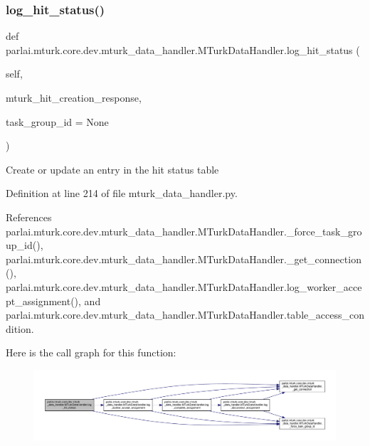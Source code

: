 \subsubsection{\texorpdfstring{log\+\_\+hit\+\_\+status()}{log\_hit\_status()}}
{\footnotesize\ttfamily def parlai.\+mturk.\+core.\+dev.\+mturk\+\_\+data\+\_\+handler.\+M\+Turk\+Data\+Handler.\+log\+\_\+hit\+\_\+status (\begin{DoxyParamCaption}\item[{}]{self,  }\item[{}]{mturk\+\_\+hit\+\_\+creation\+\_\+response,  }\item[{}]{task\+\_\+group\+\_\+id = {\ttfamily None} }\end{DoxyParamCaption})}

\begin{DoxyVerb}Create or update an entry in the hit status table\end{DoxyVerb}
 

Definition at line 214 of file mturk\+\_\+data\+\_\+handler.\+py.



References parlai.\+mturk.\+core.\+dev.\+mturk\+\_\+data\+\_\+handler.\+M\+Turk\+Data\+Handler.\+\_\+force\+\_\+task\+\_\+group\+\_\+id(), parlai.\+mturk.\+core.\+dev.\+mturk\+\_\+data\+\_\+handler.\+M\+Turk\+Data\+Handler.\+\_\+get\+\_\+connection(), parlai.\+mturk.\+core.\+dev.\+mturk\+\_\+data\+\_\+handler.\+M\+Turk\+Data\+Handler.\+log\+\_\+worker\+\_\+accept\+\_\+assignment(), and parlai.\+mturk.\+core.\+dev.\+mturk\+\_\+data\+\_\+handler.\+M\+Turk\+Data\+Handler.\+table\+\_\+access\+\_\+condition.

Here is the call graph for this function\+:
\nopagebreak
\begin{figure}[H]
\begin{center}
\leavevmode
\includegraphics[width=350pt]{classparlai_1_1mturk_1_1core_1_1dev_1_1mturk__data__handler_1_1MTurkDataHandler_a97043bdbc4faa87164cd1e9d71559327_cgraph}
\end{center}
\end{figure}
\mbox{\label{classparlai_1_1mturk_1_1core_1_1dev_1_1mturk__data__handler_1_1MTurkDataHandler_ae8c02400cd4261b79571e6108955c883}} 
